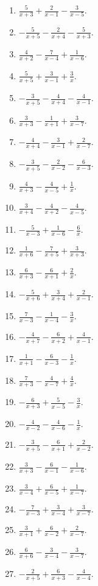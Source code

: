 \documentclass[11pt,oneside]{book}
\begin{document}
\begin{enumerate}[leftmargin=*,label=\textbf{T\arabic*.},itemsep=0.45\baselineskip]
\item $\displaystyle \frac{5}{x + 3} + \frac{2}{x - 1} - \frac{3}{x - 5}$.
\item $\displaystyle - \frac{5}{x + 5} - \frac{2}{x + 4} - \frac{5}{x + 3}$.
\item $\displaystyle \frac{4}{x + 2} - \frac{7}{x - 4} + \frac{1}{x - 6}$.
\item $\displaystyle \frac{5}{x + 5} + \frac{3}{x - 1} + \frac{3}{x}$.
\item $\displaystyle - \frac{3}{x + 5} - \frac{4}{x + 4} - \frac{4}{x - 1}$.
\item $\displaystyle \frac{3}{x + 3} - \frac{1}{x + 1} + \frac{3}{x - 7}$.
\item $\displaystyle - \frac{4}{x + 4} - \frac{3}{x - 1} + \frac{2}{x - 7}$.
\item $\displaystyle - \frac{3}{x + 5} - \frac{2}{x - 2} - \frac{6}{x - 3}$.
\item $\displaystyle \frac{4}{x + 3} - \frac{4}{x - 5} + \frac{1}{x}$.
\item $\displaystyle \frac{3}{x + 4} - \frac{4}{x + 2} - \frac{4}{x - 5}$.
\item $\displaystyle - \frac{5}{x - 3} + \frac{1}{x - 6} - \frac{6}{x}$.
\item $\displaystyle \frac{1}{x + 6} - \frac{7}{x + 5} + \frac{3}{x + 3}$.
\item $\displaystyle \frac{6}{x + 3} - \frac{6}{x + 1} + \frac{2}{x}$.
\item $\displaystyle - \frac{5}{x + 6} + \frac{3}{x + 4} + \frac{2}{x - 1}$.
\item $\displaystyle \frac{7}{x - 3} - \frac{1}{x - 4} - \frac{3}{x}$.
\item $\displaystyle - \frac{4}{x + 7} - \frac{6}{x + 2} + \frac{4}{x - 1}$.
\item $\displaystyle \frac{1}{x + 1} - \frac{6}{x - 3} - \frac{1}{x}$.
\item $\displaystyle \frac{7}{x + 3} - \frac{4}{x - 7} + \frac{4}{x}$.
\item $\displaystyle - \frac{6}{x + 3} + \frac{5}{x - 5} - \frac{3}{x}$.
\item $\displaystyle - \frac{4}{x - 2} - \frac{4}{x - 6} - \frac{1}{x}$.
\item $\displaystyle - \frac{3}{x + 5} - \frac{6}{x + 1} + \frac{2}{x - 2}$.
\item $\displaystyle \frac{3}{x + 3} - \frac{6}{x - 1} - \frac{1}{x - 6}$.
\item $\displaystyle \frac{3}{x - 4} + \frac{6}{x - 5} + \frac{1}{x - 7}$.
\item $\displaystyle - \frac{7}{x - 3} + \frac{3}{x - 4} + \frac{3}{x - 7}$.
\item $\displaystyle \frac{3}{x + 1} + \frac{6}{x - 2} + \frac{2}{x - 7}$.
\item $\displaystyle \frac{6}{x + 6} - \frac{3}{x - 4} - \frac{3}{x - 7}$.
\item $\displaystyle - \frac{2}{x + 5} + \frac{6}{x + 3} - \frac{4}{x - 4}$.
\end{enumerate}
\end{document}
